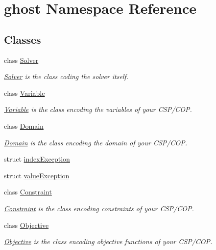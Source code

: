 \hypertarget{namespaceghost}{\section{ghost Namespace Reference}
\label{namespaceghost}
}
\subsection*{Classes}
\begin{DoxyCompactItemize}
\item 
class \hyperlink{classghost_1_1Solver}{Solver}
\begin{DoxyCompactList}\small\item\em \hyperlink{classghost_1_1Solver}{Solver} is the class coding the solver itself. \end{DoxyCompactList}\item 
class \hyperlink{classghost_1_1Variable}{Variable}
\begin{DoxyCompactList}\small\item\em \hyperlink{classghost_1_1Variable}{Variable} is the class encoding the variables of your C\-S\-P/\-C\-O\-P. \end{DoxyCompactList}\item 
class \hyperlink{classghost_1_1Domain}{Domain}
\begin{DoxyCompactList}\small\item\em \hyperlink{classghost_1_1Domain}{Domain} is the class encoding the domain of your C\-S\-P/\-C\-O\-P. \end{DoxyCompactList}\item 
struct \hyperlink{structghost_1_1indexException}{index\-Exception}
\item 
struct \hyperlink{structghost_1_1valueException}{value\-Exception}
\item 
class \hyperlink{classghost_1_1Constraint}{Constraint}
\begin{DoxyCompactList}\small\item\em \hyperlink{classghost_1_1Constraint}{Constraint} is the class encoding constraints of your C\-S\-P/\-C\-O\-P. \end{DoxyCompactList}\item 
class \hyperlink{classghost_1_1Objective}{Objective}
\begin{DoxyCompactList}\small\item\em \hyperlink{classghost_1_1Objective}{Objective} is the class encoding objective functions of your C\-S\-P/\-C\-O\-P. \end{DoxyCompactList}\item 

\end{DoxyCompactItemize}
